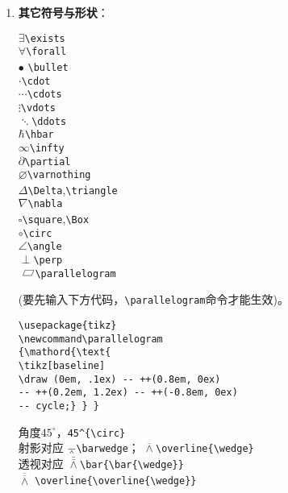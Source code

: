 \documentclass{article}
\newcommand{\q}{\quad}
\newcommand\parallelogram
{\mathord{\text{
\tikz[baseline] 
\draw (0em, .1ex)   -- ++(0.8em, 0ex) 
-- ++(0.2em, 1.2ex) -- ++(-0.8em, 0ex)
-- cycle;} } }
\begin{document}
\begin{multicols}{2}
\begin{enumerate}
\item \textbf{其它符号与形状}：
\vspace{-5mm}
\begin{multicols}{2} 
    $ \exists $\q \verb|\exists| \\
    $ \forall $\q \verb|\forall| \\    
    $ \bullet $ \q \verb|\bullet| \\
    $ \cdot $\q \verb|\cdot| \\
    $ \cdots $\q \verb|\cdots| \\
    $ \vdots $\q \verb|\vdots| \\
    $ \ddots $\q \verb|\ddots| \\
    $ \hbar $\q \verb|\hbar| \\
    $ \infty $\q \verb|\infty| \\
    $ \partial $\q \verb|\partial| \\
    $ \varnothing $\q \verb|\varnothing| \\
    $ \Delta $\q \verb|\Delta|,\verb|\triangle| \\
    $ \nabla $\q \verb|\nabla| \\
    $ \square $\q \verb|\square|,\verb|\Box|  \\
    $ \circ $\q \verb|\circ| \\
    $ \angle $\q \verb|\angle| \\
    $ \perp $\q \verb|\perp| \\   
    $ \parallelogram $\q \verb|\parallelogram|
\end{multicols} 
\vspace{-5mm} 
(要先输入下方代码，\verb|\parallelogram|命令才能生效)。
\begin{lstlisting}
\usepackage{tikz}
\newcommand\parallelogram
{\mathord{\text{
\tikz[baseline] 
\draw (0em, .1ex) -- ++(0.8em, 0ex) 
-- ++(0.2em, 1.2ex) -- ++(-0.8em, 0ex)
-- cycle;} } }
\end{lstlisting} 
角度$ 45^{\circ} $，\verb|45^{\circ}| \\
射影对应 $ \barwedge $\q \verb|\barwedge|；
$ \overline{\wedge} $\q \verb|\overline{\wedge}| \\
透视对应 $ \bar{\bar{\wedge}} $\q \verb|\bar{\bar{\wedge}}| \\
$ \overline{\overline{\wedge}} $\q 
\verb|\overline{\overline{\wedge}}| \\


\end{enumerate}
\end{multicols}
\end{document}
